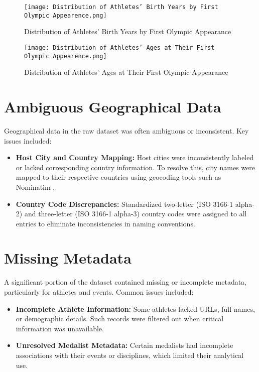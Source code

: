 \begin{figure}[ht]
    \centering
    \texttt{[image: Distribution of Athletes' Birth Years by First Olympic Appearence.png]}
    \caption{Distribution of Athletes' Birth Years by First Olympic Appearance}
    \label{fig:birth_years}
\end{figure}

\begin{figure}[ht]
    \centering
    \texttt{[image: Distribution of Athletes' Ages at Their First Olympic Appearence.png]}
    \caption{Distribution of Athletes' Ages at Their First Olympic Appearance}
    \label{fig:athlete_ages}
\end{figure}

\section{Ambiguous Geographical Data}

Geographical data in the raw dataset was often ambiguous or inconsistent. Key issues included:

\begin{itemize}
    \item \textbf{Host City and Country Mapping:} Host cities were inconsistently labeled or lacked corresponding country information. To resolve this, city names were mapped to their respective countries using geocoding tools such as Nominatim \cite{nominatim}.
    \item \textbf{Country Code Discrepancies:} Standardized two-letter (ISO 3166-1 alpha-2) and three-letter (ISO 3166-1 alpha-3) country codes were assigned to all entries to eliminate inconsistencies in naming conventions.
\end{itemize}



\section{Missing Metadata}

A significant portion of the dataset contained missing or incomplete metadata, particularly for athletes and events. Common issues included:

\begin{itemize}
    \item \textbf{Incomplete Athlete Information:} Some athletes lacked URLs, full names, or demographic details. Such records were filtered out when critical information was unavailable.
    \item \textbf{Unresolved Medalist Metadata:} Certain medalists had incomplete associations with their events or disciplines, which limited their analytical use.
\end{itemize}

